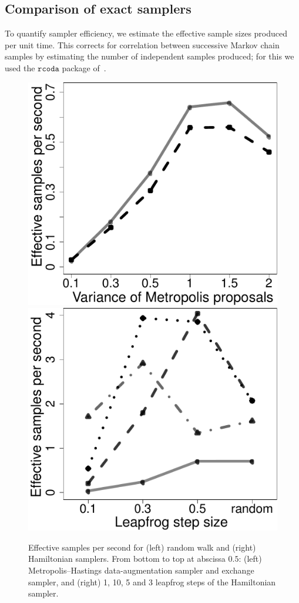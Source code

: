 \subsection{Comparison of exact samplers} \label{sec:Bayes_expt}

To quantify sampler efficiency, %
we estimate the
effective sample sizes produced per unit time. This corrects for
correlation between successive Markov chain samples
by estimating the number of independent samples produced; for this
we used the $\mathtt{rcoda}$ package of~\cite{Rcoda2006}.

  \begin{figure}
  \centering
    \includegraphics[width=.3\textwidth]{figs/mh_plot_bw.pdf}
  \centering
    \includegraphics[width=.3\textwidth]{figs/hmc_plot_bw.pdf}
\caption{Effective samples per second for (left) random walk and (right) Hamiltonian samplers. From bottom to top at abscissa $0.5$: (left) 
 Metropolis--Hastings data-augmentation sampler and exchange sampler, and 
 (right) 1, 10, 5 and 3 leapfrog steps of the Hamiltonian sampler.}
  \label{fig:samplers_comp}
  \end{figure}

